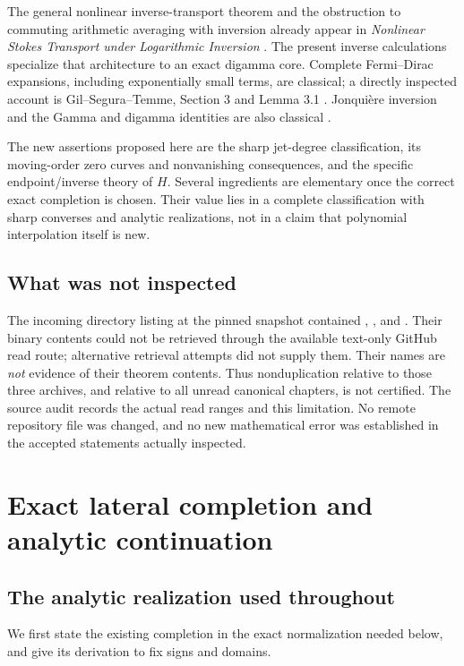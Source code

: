 \documentclass[11pt,a4paper]{article}
\numberwithin{equation}{section}
\theoremstyle{definition}\newtheorem{definition}[theorem]{Definition}
\theoremstyle{remark}\newtheorem{remark}[theorem]{Remark}
\begin{document}
The general nonlinear inverse-transport theorem and the obstruction to
commuting arithmetic averaging with inversion already appear in
\emph{Nonlinear Stokes Transport under Logarithmic Inversion}
\cite{RepoTransport}. The present inverse calculations specialize that
architecture to an exact digamma core. Complete Fermi--Dirac expansions,
including exponentially small terms, are classical; a directly inspected
account is Gil--Segura--Temme, Section 3 and Lemma 3.1 \cite{GST}.
Jonqui\`ere inversion and the Gamma and digamma identities are also
classical \cite{DLMFpoly,DLMFgamma,DLMFpsi}.

The new assertions proposed here are the sharp jet-degree classification,
its moving-order zero curves and nonvanishing consequences, and the
specific endpoint/inverse theory of $H$. Several ingredients are elementary
once the correct exact completion is chosen. Their value lies in a
complete classification with sharp converses and analytic realizations,
not in a claim that polynomial interpolation itself is new.

\subsection{What was not inspected}
The incoming directory listing at the pinned snapshot contained
,
, and
.
Their binary contents could not be retrieved through the available
text-only GitHub read route; alternative retrieval attempts did not
supply them. Their names are \emph{not} evidence of their theorem contents.
Thus nonduplication relative to those three archives, and relative to all
unread canonical chapters, is not certified. The source audit records the
actual read ranges and this limitation. No remote repository file was
changed, and no new mathematical error was established in the accepted
statements actually inspected.

\section{Exact lateral completion and analytic continuation}
\label{ojf:sec:completion}

\subsection{The analytic realization used throughout}
We first state the existing completion in the exact normalization needed
below, and give its derivation to fix signs and domains.
\end{document}
